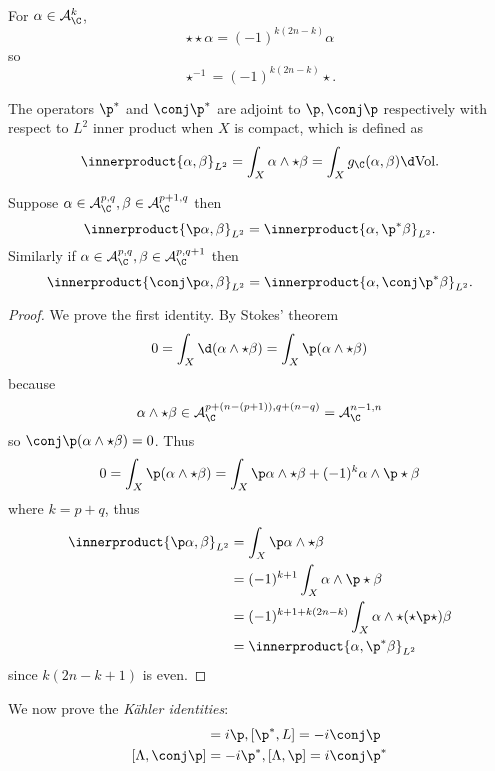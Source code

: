 \documentclass[a4paper]{article}
\newcommand{\w}{\wedge} %
\newcommand*{\ip}{\innerproduct}
\begin{document}
\begin{remark}
  For \(\alpha \in \mathcal A_\C^k\),
  \[
    \star \star \alpha = (-1)^{k (2n - k)} \alpha
  \]
  so
  \[
    \star^{-1} = (-1)^{k (2n - k)} \star.
  \]
\end{remark}

The operators \(\p^*\) and \(\conj \p^*\) are adjoint to \(\p, \conj \p\) respectively with respect to \(L^2\) inner product when \(X\) is compact, which is defined as
\[
  \ip{\alpha, \beta}_{L^2}
  = \int_X \alpha \w \star \beta
  = \int_X g_\C(\alpha, \beta) \d \text{Vol}.
\]

\begin{lemma}
  Suppose \(\alpha \in \mathcal A_\C^{p, q}, \beta \in \mathcal A_\C^{p + 1, q}\) then
  \[
    \ip{\p \alpha, \beta}_{L^2} = \ip{\alpha, \p^* \beta}_{L^2}.
  \]
  Similarly if \(\alpha \in \mathcal A_\C^{p, q}, \beta \in \mathcal A_\C^{p, q + 1}\) then
  \[
    \ip{\conj \p \alpha, \beta}_{L^2} = \ip{\alpha, \conj \p^* \beta}_{L^2}.
  \]
\end{lemma}

\begin{proof}
  We prove the first identity. By Stokes' theorem
  \[
    0
    = \int_X \d (\alpha \w \star \beta)
    = \int_X \p (\alpha \w \star \beta)
  \]
  because
  \[
    \alpha \w \star \beta \in \mathcal A_\C^{p + (n - (p + 1)), q + (n - q)} = \mathcal A_\C^{n - 1, n}
  \]
  so \(\conj \p (\alpha \w \star \beta) = 0\). Thus
  \[
    0
    = \int_X \p (\alpha \w \star \beta)
    = \int_X \p\alpha \w \star \beta + (-1)^k \alpha \w \p \star \beta
  \]
  where \(k = p + q\), thus
  \begin{align*}
    \ip{\p \alpha, \beta}_{L^2}
    &= \int_X \p \alpha \w \star \beta \\
    &= (-1)^{k + 1} \int_X \alpha \w \p \star \beta \\
    &= (-1)^{k + 1 + k(2n - k)} \int_X \alpha \w \star (\star \p \star) \beta \\
    &= \ip{\alpha, \p^* \beta}_{L^2}
  \end{align*}
  since \(k(2n - k + 1)\) is even.
\end{proof}

We now prove the \emph{Kähler identities}:
\begin{align*}
  [\conj \p^*, L] &= i \p, [\p^*, L] = -i \conj \p \\
  [\Lambda, \conj \p] &= - i \p^*, [\Lambda, \p] = i\conj \p^*
\end{align*}
\end{document}
